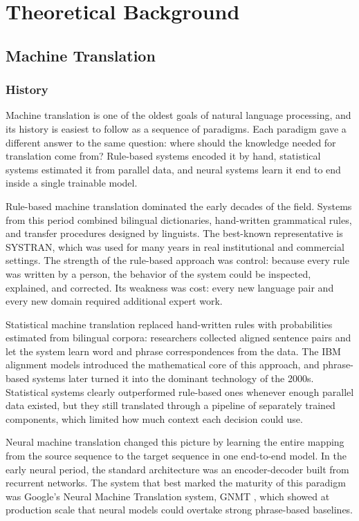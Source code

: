 \chapter{Theoretical Background}

\section{Machine Translation}

\subsection{History}

\quad Machine translation is one of the oldest goals of natural language
processing, and its history is easiest to follow as a sequence of paradigms.
Each paradigm gave a different answer to the same question: where should the
knowledge needed for translation come from? Rule-based systems encoded it by
hand, statistical systems estimated it from parallel data, and neural systems
learn it end to end inside a single trainable model.

Rule-based machine translation dominated the early decades of the field.
Systems from this period combined bilingual dictionaries, hand-written
grammatical rules, and transfer procedures designed by linguists. The
best-known representative is SYSTRAN, which was used for many years in real
institutional and commercial settings. The strength of the rule-based approach
was control: because every rule was written by a person, the behavior of the
system could be inspected, explained, and corrected. Its weakness was cost:
every new language pair and every new domain required additional expert work.

Statistical machine translation replaced hand-written rules with probabilities
estimated from bilingual corpora: researchers collected aligned sentence pairs
and let the system learn word and phrase correspondences from the data. The
IBM alignment models
introduced the mathematical core of this approach, and phrase-based systems
later turned it into the dominant technology of the 2000s. Statistical systems
clearly outperformed rule-based ones whenever enough parallel data existed,
but they still translated through a pipeline of separately trained components,
which limited how much context each decision could use.

Neural machine translation changed this picture by learning the entire mapping
from the source sequence to the target sequence in one end-to-end model. In
the early neural period, the standard architecture was an encoder-decoder
built from recurrent networks. The system that best marked the maturity of
this paradigm was Google's Neural Machine Translation system, GNMT
\cite{wu2016gnmt}, which showed at production scale that neural models could
overtake strong phrase-based baselines.

